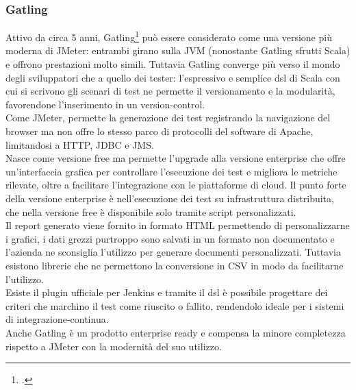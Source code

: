\subsubsection{Gatling}
Attivo da circa 5 anni, Gatling\footcite{site:gatling} può essere considerato come una versione più moderna di JMeter: entrambi girano sulla JVM (nonostante Gatling sfrutti Scala) e offrono prestazioni molto simili. Tuttavia Gatling converge più verso il mondo degli sviluppatori che a quello dei tester: l'espressivo e semplice \gls{dsl} di Scala con cui si scrivono gli scenari di test ne permette il versionamento e la modularità, favorendone l'inserimento in un \gls{version-control}. \\
Come JMeter, permette la generazione dei test registrando la navigazione del browser ma non offre lo stesso parco di protocolli del software di Apache, limitandosi a HTTP, JDBC e JMS. \\
Nasce come versione free ma permette l'upgrade alla versione enterprise che offre un'interfaccia grafica per controllare l'esecuzione dei test e migliora le metriche rilevate, oltre a facilitare l'integrazione con le piattaforme di \gls{cloud}. Il punto forte della versione enterprise è nell'esecuzione dei test su infrastruttura distribuita, che nella versione free è disponibile solo tramite script personalizzati. \\
Il report generato viene fornito in formato HTML permettendo di personalizzarne i grafici, i dati grezzi purtroppo sono salvati in un formato non documentato e l'azienda ne sconsiglia l'utilizzo per generare documenti personalizzati. Tuttavia esistono librerie che ne permettono la conversione in CSV in modo da facilitarne l'utilizzo.\\
Esiste il \gls{plugin} ufficiale per Jenkins e tramite il \gls{dsl} è possibile progettare dei criteri che marchino il test come riuscito o fallito, rendendolo ideale per i sistemi di \gls{integrazione-continua}.\\
Anche Gatling è un prodotto enterprise ready e compensa la minore completezza rispetto a JMeter con la modernità del suo utilizzo.
